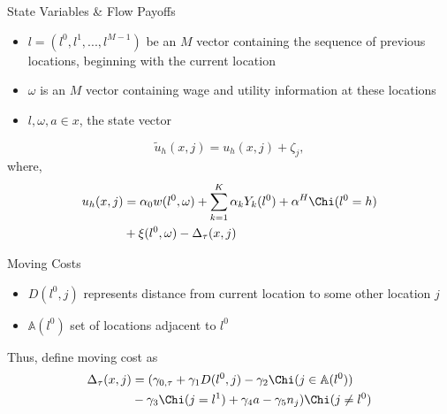 \documentclass[aspectratio=169,professionalfonts]{beamer}
\begin{document}
\begin{frame}{State Variables \& Flow Payoffs}
  \begin{itemize}
    \item $l = (l^0, l^1, ..., l^{M-1})$ be an $M$ vector containing the sequence of previous locations, beginning with the current location
    \item $\omega$ is an $M$ vector containing wage and utility information at these locations
    \item $l,\omega, a \in x$, the state vector
  \end{itemize}
  \begin{equation}
    \tilde{u}_h(x,j) = u_h(x,j) + \zeta_j,
  \end{equation}
  where,
  \begin{gather*}
    \begin{split}
      u_h(x,j) &= \alpha_0w(l^0,\omega) + \sum\limits_{k=1}^K\alpha_kY_k(l^0)+\alpha^H\Chi(l^0=h) \\
              &+ \xi(l^0,\omega) - \Delta_{\tau}(x,j)
    \end{split}
  \end{gather*}
\end{frame}

\begin{frame}{Moving Costs}
  \begin{itemize}
    \item $D(l^0, j)$ represents distance from current location to some other location $j$
    \item $\mathbb{A}(l^0)$ set of locations adjacent to $l^0$
  \end{itemize}
  Thus, define moving cost as
  \begin{equation}
    \begin{split}
      \Delta_{\tau}(x,j) &= (\gamma_{0,\tau} + \gamma_1D(l^0, j) - \gamma_2\Chi(j\in\mathbb{A}(l^0)) \\
                 &- \gamma_3\Chi(j=l^1) + \gamma_4a - \gamma_5n_j)\Chi(j\ne l^0)
    \end{split}
  \end{equation}
\end{frame}
\end{document}
